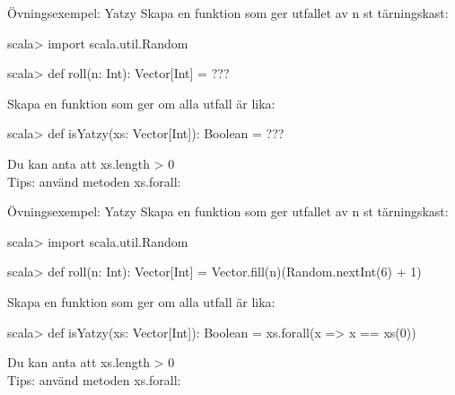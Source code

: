 \begin{Slide}{Övningsexempel: Yatzy}\SlideFontSmall
Skapa en funktion  som ger utfallet av n st tärningskast:
\begin{REPL}
scala> import scala.util.Random

scala> def roll(n: Int): Vector[Int] = ???
\end{REPL}

Skapa en funktion  som ger  om alla utfall är lika:
\begin{REPL}
scala> def isYatzy(xs: Vector[Int]): Boolean = ???
\end{REPL}
Du kan anta att xs.length > 0\\
Tips: använd metoden xs.forall: \\
\end{Slide}


\begin{Slide}{Övningsexempel: Yatzy}\SlideFontSmall
Skapa en funktion  som ger utfallet av n st tärningskast:
\begin{REPL}
scala> import scala.util.Random

scala> def roll(n: Int): Vector[Int] = Vector.fill(n)(Random.nextInt(6) + 1)
\end{REPL}

Skapa en funktion  som ger  om alla utfall är lika:
\begin{REPL}
scala> def isYatzy(xs: Vector[Int]): Boolean = xs.forall(x => x == xs(0))
\end{REPL}
Du kan anta att xs.length > 0\\
Tips: använd metoden xs.forall: \\
\end{Slide}


